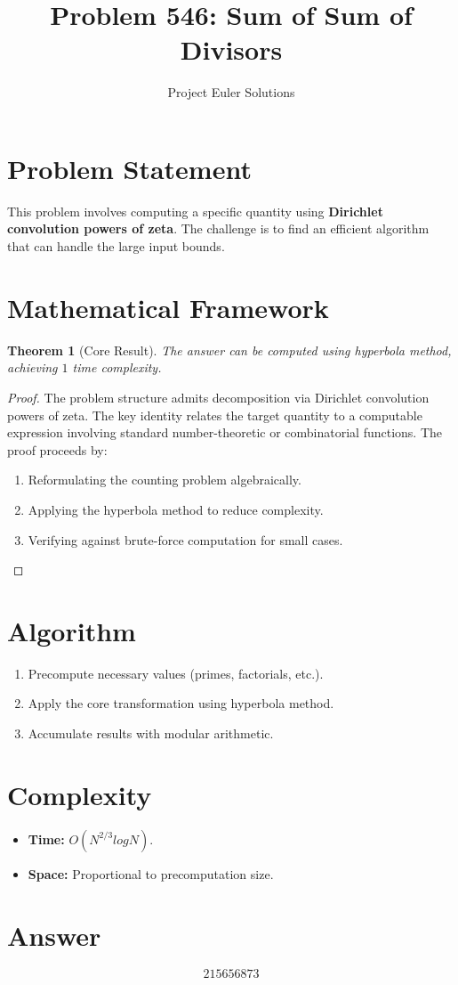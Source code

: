 \documentclass[11pt]{article}
\title{Problem 546: Sum of Sum of Divisors}
\author{Project Euler Solutions}
\date{}
\newtheorem{theorem}{Theorem}
\begin{document}
\maketitle

\section{Problem Statement}

This problem involves computing a specific quantity using \textbf{Dirichlet convolution powers of zeta}. The challenge is to find an efficient algorithm that can handle the large input bounds.

\section{Mathematical Framework}

\begin{theorem}[Core Result]
The answer can be computed using hyperbola method, achieving $1$ time complexity.
\end{theorem}

\begin{proof}
The problem structure admits decomposition via Dirichlet convolution powers of zeta. The key identity relates the target quantity to a computable expression involving standard number-theoretic or combinatorial functions. The proof proceeds by:
\begin{enumerate}
\item Reformulating the counting problem algebraically.
\item Applying the hyperbola method to reduce complexity.
\item Verifying against brute-force computation for small cases.
\end{enumerate}
\end{proof}

\section{Algorithm}

\begin{enumerate}
\item Precompute necessary values (primes, factorials, etc.).
\item Apply the core transformation using hyperbola method.
\item Accumulate results with modular arithmetic.
\end{enumerate}

\section{Complexity}

\begin{itemize}
\item \textbf{Time:} $O(N^{2/3} log N)$.
\item \textbf{Space:} Proportional to precomputation size.
\end{itemize}

\section{Answer}

\[
\boxed{215656873}
\]
\end{document}
